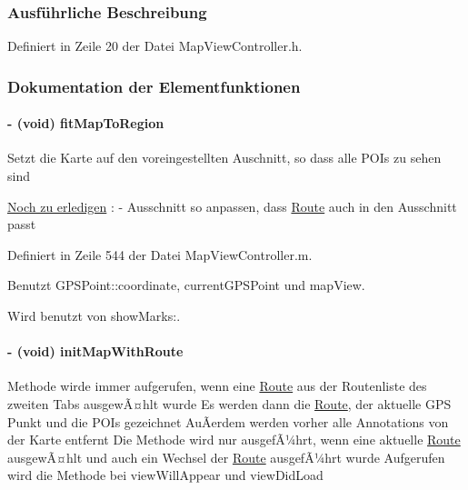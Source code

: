 \subsubsection{Ausführliche Beschreibung}


Definiert in Zeile 20 der Datei MapViewController.h.

\subsubsection{Dokumentation der Elementfunktionen}
\hypertarget{interface_map_view_controller_a518a53d75a01058fcbb9f32362504103}{
\paragraph[{fitMapToRegion}]{\setlength{\rightskip}{0pt plus 5cm}-\/ (void) fitMapToRegion }\hfill}
\label{interface_map_view_controller_a518a53d75a01058fcbb9f32362504103}
Setzt die Karte auf den voreingestellten Auschnitt, so dass alle POIs zu sehen sind \begin{Desc}
\item[\hyperlink{todo__todo000001}{Noch zu erledigen}]: -\/ Ausschnitt so anpassen, dass \hyperlink{interface_route}{Route} auch in den Ausschnitt passt \end{Desc}


Definiert in Zeile 544 der Datei MapViewController.m.

Benutzt GPSPoint::coordinate, currentGPSPoint und mapView.

Wird benutzt von showMarks:.\hypertarget{interface_map_view_controller_ab13448226549116f45240b806aa00290}{
\paragraph[{initMapWithRoute}]{\setlength{\rightskip}{0pt plus 5cm}-\/ (void) initMapWithRoute }\hfill}
\label{interface_map_view_controller_ab13448226549116f45240b806aa00290}
Methode wirde immer aufgerufen, wenn eine \hyperlink{interface_route}{Route} aus der Routenliste des zweiten Tabs ausgewÃ¤hlt wurde Es werden dann die \hyperlink{interface_route}{Route}, der aktuelle GPS Punkt und die POIs gezeichnet AuÃerdem werden vorher alle Annotations von der Karte entfernt Die Methode wird nur ausgefÃ¼hrt, wenn eine aktuelle \hyperlink{interface_route}{Route} ausgewÃ¤hlt und auch ein Wechsel der \hyperlink{interface_route}{Route} ausgefÃ¼hrt wurde Aufgerufen wird die Methode bei viewWillAppear und viewDidLoad 

